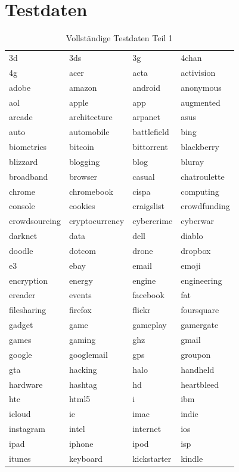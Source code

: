 \documentclass[12pt,a4paper]{report}
\begin{document}
\newpage
	\section{Testdaten}
	\label{sec:Testdaten}

\begin{table}[H]
\caption{Vollständige Testdaten Teil 1}
\begin{center}
\begin{tabular}{l|l|l|l}
3d & 3ds & 3g & 4chan\\
4g & acer & acta & activision\\
adobe & amazon & android & anonymous\\
aol & apple & app & augmented\\
arcade & architecture & arpanet & asus\\
auto & automobile & battlefield & bing\\
biometrics & bitcoin & bittorrent & blackberry\\
blizzard & blogging & blog & bluray\\
broadband & browser & casual & chatroulette\\
chrome & chromebook & cispa & computing\\
console & cookies & craigslist & crowdfunding\\
crowdsourcing & cryptocurrency & cybercrime & cyberwar\\
darknet & data & dell & diablo\\
doodle & dotcom & drone & dropbox\\
e3 & ebay & email & emoji\\
encryption & energy & engine & engineering\\
ereader & events & facebook & fat\\
filesharing & firefox & flickr & foursquare\\
gadget & game & gameplay & gamergate\\
games & gaming & ghz & gmail\\
google & googlemail & gps & groupon\\
gta & hacking & halo & handheld\\
hardware & hashtag & hd & heartbleed\\
htc & html5 & i & ibm\\
icloud & ie & imac & indie\\
instagram & intel & internet & ios\\
ipad & iphone & ipod & isp\\
itunes & keyboard & kickstarter & kindle\\

\end{tabular}
\end{center}
\end{table}
\end{document}
